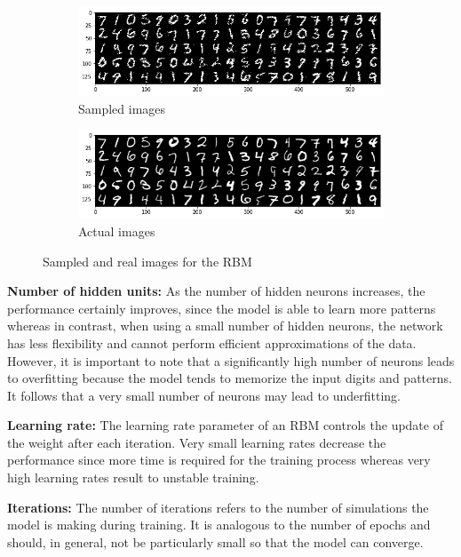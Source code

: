 \documentclass[11pt,conference,compsoc]{IEEEtran}
\begin{document}
\begin{figure}[h]
    \centering
    \begin{subfigure}[b]{0.32\textwidth}
    \includegraphics[width=\linewidth]{images/100neurons_30iter.png}
    \caption{Sampled images}
    \end{subfigure}
    \begin{subfigure}[b]{0.32\textwidth}
    \includegraphics[width=\linewidth]{images/actual_imgs.png}
    \caption{Actual images}
    \end{subfigure}
    \caption{Sampled and real images for the RBM}
    \label{fig:13}
\end{figure}


\textbf{Number of hidden units:} As the number of hidden neurons increases, the performance certainly improves, since the model is able to learn more patterns whereas in contrast, when using a small number of hidden neurons, the network has less flexibility and cannot perform efficient approximations of the data. However, it is important to note that a significantly high number of neurons leads to overfitting because the model tends to memorize the input digits and patterns. It follows that a very small number of neurons may lead to underfitting. 

\textbf{Learning rate:} The learning rate parameter of an RBM controls the update of the weight after each iteration. Very small learning rates decrease the performance since more time is required for the training process whereas very high learning rates result to unstable training. 

\textbf{Iterations:} The number of iterations refers to the number of simulations the model is making during training. It is analogous to the number of epochs and should, in general, not be particularly small so that the model can converge. 
\end{document}
